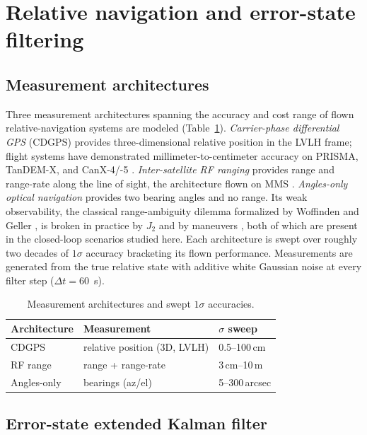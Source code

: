 \section{Relative navigation and error-state filtering}\label{sec:nav}

\subsection{Measurement architectures}

Three measurement architectures spanning the accuracy and cost range of
flown relative-navigation systems are modeled (Table~\ref{tab:sensors}).
\emph{Carrier-phase differential GPS} (CDGPS) provides three-dimensional
relative position in the LVLH frame; flight systems have demonstrated
millimeter-to-centimeter accuracy on PRISMA, TanDEM-X, and CanX-4/-5
\cite{busse2003cdgps,kroes2006thesis,kroes2005precise,
montenbruck2011tandemxnav,kahr2018canx}. \emph{Inter-satellite RF ranging}
provides range and range-rate along the line of sight, the architecture
flown on MMS \cite{roscoe2011mms}. \emph{Angles-only optical navigation}
provides two bearing angles and no range. Its weak observability, the
classical range-ambiguity dilemma formalized by Woffinden and Geller
\cite{woffinden2009observability}, is broken in practice by $J_2$ and by
maneuvers \cite{damico2013argon,gaias2014anglesonly,sullivan2021nonlinear,
willis2024polynomial}, both of which are present in the closed-loop
scenarios studied here. Each architecture is swept over roughly two decades
of $1\sigma$ accuracy bracketing its flown performance. Measurements are
generated from the true relative state with additive white Gaussian noise
at every filter step ($\Delta t = 60$~s).

\begin{table}[t]
  \centering
  \caption{Measurement architectures and swept $1\sigma$ accuracies.}
  \label{tab:sensors}
  \begin{tabular}{lll}
    \toprule
    Architecture & Measurement & $\sigma$ sweep \\
    \midrule
    CDGPS & relative position (3D, LVLH) & 0.5--100\,cm \\
    RF range & range + range-rate & 3\,cm--10\,m \\
    Angles-only & bearings (az/el) & 5--300\,arcsec \\
    \bottomrule
  \end{tabular}
\end{table}

\subsection{Error-state extended Kalman filter}


